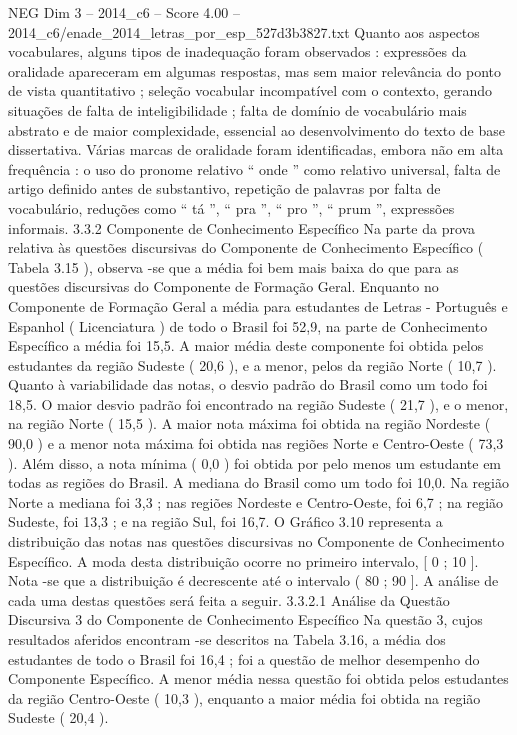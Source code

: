 \begin{textsample}{NEG Dim 3 – 2014\_c6 – Score 4.00 – 2014\_c6/enade\_2014\_letras\_por\_esp\_527d3b3827.txt}
Quanto aos aspectos vocabulares, alguns tipos de inadequação foram observados : expressões da oralidade apareceram em algumas respostas, mas sem maior relevância do ponto de vista quantitativo ; seleção vocabular incompatível com o contexto, gerando situações de falta de inteligibilidade ; falta de domínio de vocabulário mais abstrato e de maior complexidade, essencial ao desenvolvimento do texto de base dissertativa.
Várias marcas de oralidade foram identificadas, embora não em alta frequência : o uso do pronome relativo “ onde ” como relativo universal, falta de artigo definido antes de substantivo, repetição de palavras por falta de vocabulário, reduções como “ tá ”, “ pra ”, “ pro ”, “ prum ”, expressões informais. 3.3.2 Componente de Conhecimento Específico Na parte da prova relativa às questões discursivas do Componente de Conhecimento Específico ( Tabela 3.15 ), observa -se que a média foi bem mais baixa do que para as questões discursivas do Componente de Formação Geral.
Enquanto no Componente de Formação Geral a média para estudantes de Letras - Português e Espanhol ( Licenciatura ) de todo o Brasil foi 52,9, na parte de Conhecimento Específico a média foi 15,5.
A maior média deste componente foi obtida pelos estudantes da região Sudeste ( 20,6 ), e a menor, pelos da região Norte ( 10,7 ).
Quanto à variabilidade das notas, o desvio padrão do Brasil como um todo foi 18,5.
O maior desvio padrão foi encontrado na região Sudeste ( 21,7 ), e o menor, na região Norte ( 15,5 ).
A maior nota máxima foi obtida na região Nordeste ( 90,0 ) e a menor nota máxima foi obtida nas regiões Norte e Centro-Oeste ( 73,3 ).
Além disso, a nota mínima ( 0,0 ) foi obtida por pelo menos um estudante em todas as regiões do Brasil.
A mediana do Brasil como um todo foi 10,0.
Na região Norte a mediana foi 3,3 ; nas regiões Nordeste e Centro-Oeste, foi 6,7 ; na região Sudeste, foi 13,3 ; e na região Sul, foi 16,7.
O Gráfico 3.10 representa a distribuição das notas nas questões discursivas no Componente de Conhecimento Específico.
A moda desta distribuição ocorre no primeiro intervalo, [ 0 ; 10 ].
Nota -se que a distribuição é decrescente até o intervalo ( 80 ; 90 ].
A análise de cada uma destas questões será feita a seguir. 3.3.2.1 Análise da Questão Discursiva 3 do Componente de Conhecimento Específico Na questão 3, cujos resultados aferidos encontram -se descritos na Tabela 3.16, a média dos estudantes de todo o Brasil foi 16,4 ; foi a questão de melhor desempenho do Componente Específico.
A menor média nessa questão foi obtida pelos estudantes da região Centro-Oeste ( 10,3 ), enquanto a maior média foi obtida na região Sudeste ( 20,4 ).

\end{textsample}
